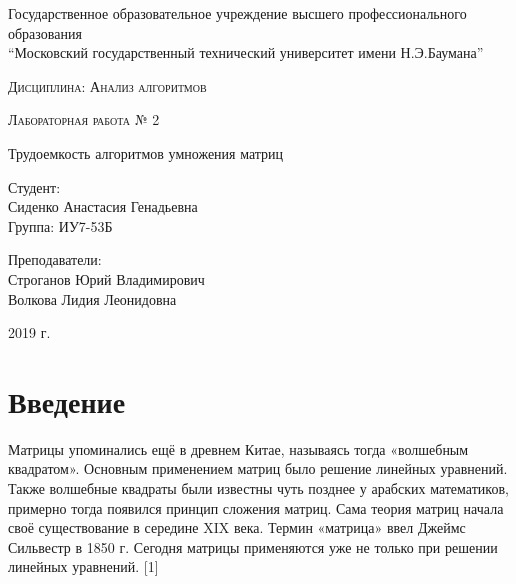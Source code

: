 \documentclass[a4paper,14pt]{article} %
\newcommand{\anonsection}[1]{\section*{#1}\addcontentsline{toc}{section}{#1}}
\begin{document}
	\begin{titlepage}

       		\begin{center}
         		\large
		
        			Государственное образовательное учреждение высшего профессионального образования\\
       			“Московский государственный технический университет имени Н.Э.Баумана”
         		\vspace{3cm}
            
            		\textsc{Дисциплина: Анализ алгоритмов}
           		\vspace{0.5cm}
                
            		\textsc{Лабораторная работа № 2}
           		 \vspace{3cm}
            
           		 \LARGE 
		 
		 	Трудоемкость алгоритмов умножения матриц
           		 \vspace{3cm}
            
            		\begin{flushright}
            			Студент: \\
				Сиденко Анастасия Генадьевна \\   
            			Группа: ИУ7-53Б \\
           			\hfill
            
           			Преподаватели: \\
				Строганов Юрий Владимирович \\
           			Волкова Лидия Леонидовна
            			\vfill
            		\end{flushright}
		
			\large
            		2019 г.
		\end{center}

	\end{titlepage}
    
	\tableofcontents
	
	\newpage
    
	\anonsection{Введение}
	\hfill
	
	Матрицы упоминались ещё в древнем Китае, называясь тогда «волшебным квадратом». Основным применением матриц было решение линейных уравнений. Также волшебные квадраты были известны чуть позднее у арабских математиков, примерно тогда появился принцип сложения матриц. Сама теория матриц начала своё существование в середине XIX века. Термин «матрица» ввел Джеймс Сильвестр в 1850 г. Сегодня матрицы применяются уже не только при решении линейных уравнений. [1]
	
\end{document}
